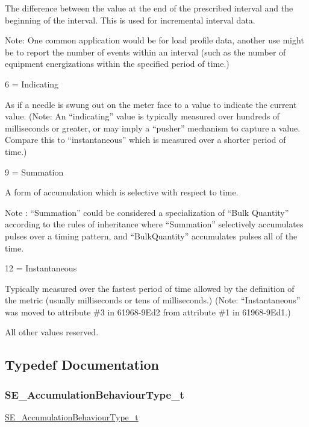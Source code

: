 The difference between the value at the end of the prescribed interval and the beginning of the interval. This is used for incremental interval data.

Note\+: One common application would be for load profile data, another use might be to report the number of events within an interval (such as the number of equipment energizations within the specified period of time.)

6 = Indicating

As if a needle is swung out on the meter face to a value to indicate the current value. (Note\+: An “indicating” value is typically measured over hundreds of milliseconds or greater, or may imply a “pusher” mechanism to capture a value. Compare this to “instantaneous” which is measured over a shorter period of time.)

9 = Summation

A form of accumulation which is selective with respect to time.

Note \+: “\+Summation” could be considered a specialization of “\+Bulk Quantity” according to the rules of inheritance where “\+Summation” selectively accumulates pulses over a timing pattern, and “\+Bulk\+Quantity” accumulates pulses all of the time.

12 = Instantaneous

Typically measured over the fastest period of time allowed by the definition of the metric (usually milliseconds or tens of milliseconds.) (Note\+: “\+Instantaneous” was moved to attribute \#3 in 61968-\/9\+Ed2 from attribute \#1 in 61968-\/9\+Ed1.)

All other values reserved. 

\subsection{Typedef Documentation}
\mbox{\label{group__AccumulationBehaviourType_gaa25de69f43be64dff9ec0bdf3ef685d2}} 
\subsubsection{\texorpdfstring{S\+E\+\_\+\+Accumulation\+Behaviour\+Type\+\_\+t}{SE\_AccumulationBehaviourType\_t}}
{\footnotesize\ttfamily \hyperlink{group__AccumulationBehaviourType_gaa25de69f43be64dff9ec0bdf3ef685d2}{S\+E\+\_\+\+Accumulation\+Behaviour\+Type\+\_\+t}}

